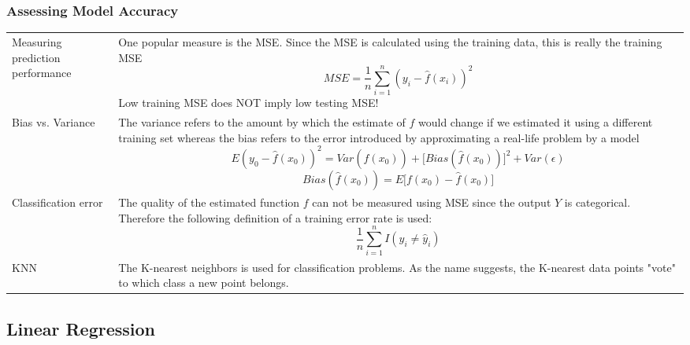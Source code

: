 \subsubsection{Assessing Model Accuracy}
\begin{onehalfspace}
	\begin{tabularx}{\textwidth}{p{3cm}X}
		Measuring prediction performance & One popular measure is the MSE. Since the MSE is calculated using the training 
		data, this is really the training MSE \[ MSE = \frac{1}{n} \sum_{i=1}^{n} (y_i-\hat{f} (x_i))^2 \] 
		Low training MSE does NOT imply low testing MSE! \\
		Bias vs. Variance & The variance refers to the amount by which the estimate of $f$ would change if we estimated 
		it using a different training set whereas the bias refers to the error introduced by approximating a real-life 
		problem by a model
		\[ E(y_0 -\hat{f}(x_0))^2 = Var(\hat{f}(x_0)) + \lbrack Bias(\hat{f}(x_0))\rbrack ^2 +Var(\epsilon ) \] 
		\[ Bias(\hat{f}(x_0)) = E\lbrack f(x_0)-\hat{f}(x_0)\rbrack \] \\
		Classification error & The quality of the estimated function $f$ can not be measured using MSE since the output $Y$ 
		is categorical. Therefore the following definition of a training error rate is used:
		\[ \frac{1}{n} \sum_{i=1}^{n} I(y_i\neq \hat{y}_i) \] \\
		KNN & The K-nearest neighbors is used for classification problems. As the name suggests, the K-nearest data points 
		"vote"{} to which class a new point belongs. \\
	\end{tabularx}
\end{onehalfspace}

\subsection{Linear Regression}

